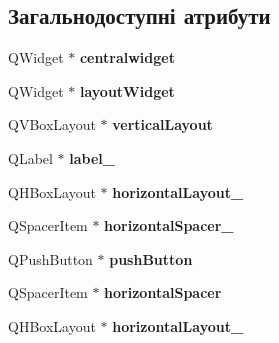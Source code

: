 \subsection*{Загальнодоступні атрибути}
\begin{DoxyCompactItemize}
\item 
\hypertarget{classUi__ExUserScreen_a8c7e5942867a96c380aed5bb557b5eb4}{Q\-Widget $\ast$ {\bfseries centralwidget}}\label{classUi__ExUserScreen_a8c7e5942867a96c380aed5bb557b5eb4}

\item 
\hypertarget{classUi__ExUserScreen_af711cc2fb8f066b8ab70ec20b4682f24}{Q\-Widget $\ast$ {\bfseries layout\-Widget}}\label{classUi__ExUserScreen_af711cc2fb8f066b8ab70ec20b4682f24}

\item 
\hypertarget{classUi__ExUserScreen_adbfa02145da0128b4a3ccd9f01b24724}{Q\-V\-Box\-Layout $\ast$ {\bfseries vertical\-Layout}}\label{classUi__ExUserScreen_adbfa02145da0128b4a3ccd9f01b24724}

\item 
\hypertarget{classUi__ExUserScreen_a2dcc62857d7fb6d0c69c311cd3cf68fb}{Q\-Label $\ast$ {\bfseries label\-\_}}\label{classUi__ExUserScreen_a2dcc62857d7fb6d0c69c311cd3cf68fb}

\item 
\hypertarget{classUi__ExUserScreen_adf3b676ef1a06e1d2403d39d5baa11d6}{Q\-H\-Box\-Layout $\ast$ {\bfseries horizontal\-Layout\-\_}}\label{classUi__ExUserScreen_adf3b676ef1a06e1d2403d39d5baa11d6}

\item 
\hypertarget{classUi__ExUserScreen_a66a7ff763385478d0eed734d2e5dbafb}{Q\-Spacer\-Item $\ast$ {\bfseries horizontal\-Spacer\-\_}}\label{classUi__ExUserScreen_a66a7ff763385478d0eed734d2e5dbafb}

\item 
\hypertarget{classUi__ExUserScreen_a9d693fdaf0672f2e463185c022344358}{Q\-Push\-Button $\ast$ {\bfseries push\-Button}}\label{classUi__ExUserScreen_a9d693fdaf0672f2e463185c022344358}

\item 
\hypertarget{classUi__ExUserScreen_ae222f5d71ebc6568aef03b69d0feea16}{Q\-Spacer\-Item $\ast$ {\bfseries horizontal\-Spacer}}\label{classUi__ExUserScreen_ae222f5d71ebc6568aef03b69d0feea16}

\item 
\hypertarget{classUi__ExUserScreen_ad619ce4f15fbe81a44c96100791d4396}{Q\-H\-Box\-Layout $\ast$ {\bfseries horizontal\-Layout\-\_}}\label{classUi__ExUserScreen_ad619ce4f15fbe81a44c96100791d4396}


\end{DoxyCompactItemize}
